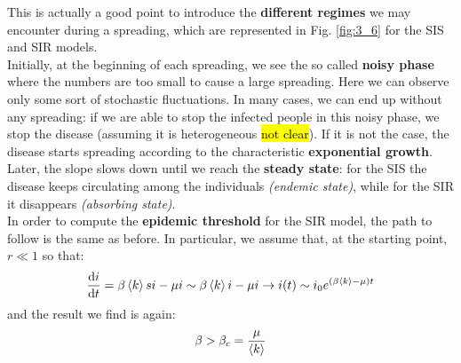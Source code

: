 \documentclass[../main/main.tex]{subfiles}
\begin{document}
This is actually a good point to introduce the \textbf{different regimes} we may encounter during a spreading, which are represented in Fig. \ref{fig:3_6} for the SIS and SIR models.\\
Initially, at the beginning of each spreading, we see the so called \textbf{noisy phase} where the numbers are too small to cause a large spreading. Here we can observe only some sort of stochastic fluctuations. In many cases, we can end up without any spreading: if we are able to stop the infected people in this noisy phase, we stop the disease (assuming it is heterogeneous \hl{not clear}). If it is not the case, the disease starts spreading according to the characteristic \textbf{exponential growth}. Later, the slope slows down until we reach the \textbf{steady state}: for the SIS the disease keeps circulating among the individuals \textit{(endemic state)}, while for the SIR it disappears \textit{(absorbing state)}.\\

In order to compute the \textbf{epidemic threshold} for the SIR model, the path to follow is the same as before. In particular, we assume that, at the starting point, $ r \ll 1 $ so that:
\begin{equation*}
  \dv{i}{t} = \beta \expval{k} s i - \mu i \sim \beta \expval{k} i - \mu i \rightarrow i(t) \sim i_0 e^{(\beta \expval{k} - \mu  )t}
\end{equation*}
and the result we find is again:
\begin{equation}
  \beta > \beta _c = \frac{\mu }{\expval{k} }
\end{equation}
\end{document}
